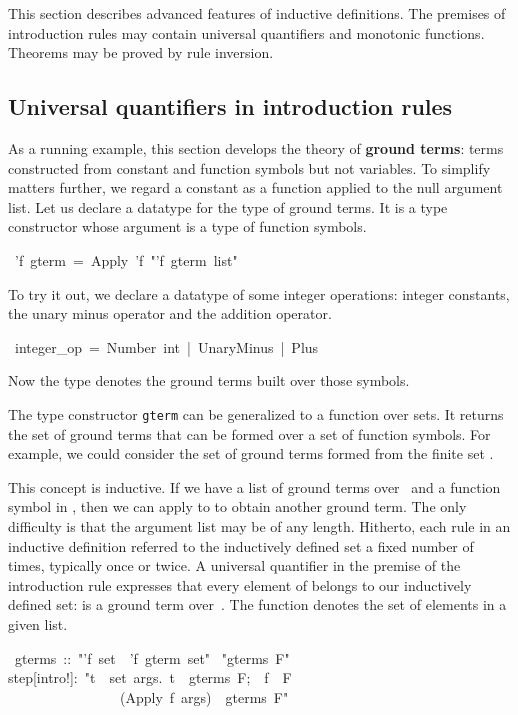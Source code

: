 
This section describes advanced features of inductive definitions. 
The premises of introduction rules may contain universal quantifiers and
monotonic functions.  Theorems may be proved by rule inversion.

\subsection{Universal quantifiers in introduction rules}
\label{sec:gterm-datatype}

As a running example, this section develops the theory of \textbf{ground
terms}: terms constructed from constant and function 
symbols but not variables. To simplify matters further, we regard a
constant as a function applied to the null argument  list.  Let us declare a
datatype  for the type of ground  terms. It is a type constructor
whose argument is a type of  function symbols. 
\begin{isabelle}
\ 'f\ gterm\ =\ Apply\ 'f\ "'f\ gterm\ list"
\end{isabelle}
To try it out, we declare a datatype of some integer operations: 
integer constants, the unary minus operator and the addition 
operator. 
\begin{isabelle}
\ integer_op\ =\ Number\ int\ |\ UnaryMinus\ |\ Plus
\end{isabelle}
Now the type  denotes the ground 
terms built over those symbols.

The type constructor \texttt{gterm} can be generalized to a function 
over sets.  It returns 
the set of ground terms that can be formed over a set  of function symbols. For
example,  we could consider the set of ground terms formed from the finite 
set {}.

This concept is inductive. If we have a list  of ground terms 
over~ and a function symbol  in , then we 
can apply  to   to obtain another ground term. 
The only difficulty is that the argument list may be of any length. Hitherto, 
each rule in an inductive definition referred to the inductively 
defined set a fixed number of times, typically once or twice. 
A universal quantifier in the premise of the introduction rule 
expresses that every element of  belongs
to our inductively defined set: is a ground term 
over~.  The function {} denotes the set of elements in a given 
list. 
\begin{isabelle}
\ gterms\ ::\ "'f\ set\ \isasymRightarrow \ 'f\ gterm\ set"\isanewline
{}\ "gterms\ F"\isanewline
{}\isanewline
step[intro!]:\ "\isasymlbrakk \isasymforall t\ \isasymin \ set\ args.\ t\ \isasymin \ gterms\ F;\ \ f\ \isasymin \ F\isasymrbrakk \isanewline
\ \ \ \ \ \ \ \ \ \ \ \ \ \ \ \isasymLongrightarrow \ (Apply\ f\ args)\ \isasymin \ gterms\
F"
\end{isabelle}

